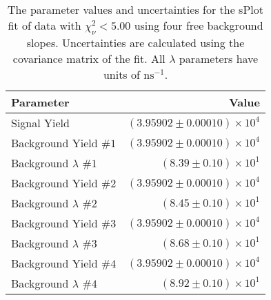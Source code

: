
\begin{table}[ht]
    \begin{center}
        \begin{tabular}{lr}\toprule
            Parameter & Value \\\midrule
            Signal Yield & $(3.95902 \pm 0.00010) \times 10^{4}$ \\
            Background Yield $\#1$ & $(3.95902 \pm 0.00010) \times 10^{4}$ \\
            Background $\lambda$ $\#1$ & $(8.39 \pm 0.10) \times 10^{1}$ \\
            Background Yield $\#2$ & $(3.95902 \pm 0.00010) \times 10^{4}$ \\
            Background $\lambda$ $\#2$ & $(8.45 \pm 0.10) \times 10^{1}$ \\
            Background Yield $\#3$ & $(3.95902 \pm 0.00010) \times 10^{4}$ \\
            Background $\lambda$ $\#3$ & $(8.68 \pm 0.10) \times 10^{1}$ \\
            Background Yield $\#4$ & $(3.95902 \pm 0.00010) \times 10^{4}$ \\
            Background $\lambda$ $\#4$ & $(8.92 \pm 0.10) \times 10^{1}$ \\\bottomrule
        \end{tabular}
        \caption{The parameter values and uncertainties for the sPlot fit of data with $\chi^2_\nu < 5.00$ using four free background slopes. Uncertainties are calculated using the covariance matrix of the fit. All $\lambda$ parameters have units of $\si{\nano\second}^{-1}$.}\label{tab:splot-fit-results-chisqdof-5.00-free-4}
    \end{center}
\end{table}
